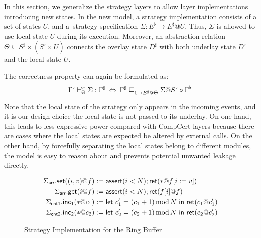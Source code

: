 \documentclass[acmsmall,review,anonymous]{acmart}\settopmatter{printfolios=true,printccs=false,printacmref=false}
\begin{document}

In this section,
we generalize the strategy layers
to allow layer implementations
introducing new states.
In the new model,
a strategy implementation consists of
a set of states $U$,
and a~strategy specification $\Sigma : E^\flat \rightarrow E^\sharp @U$.
Thus, $\Sigma$ is allowed to
use local state $U$ during its execution.
Moreover, an abstraction relation
$\Theta \subseteq S^\sharp \times (S^\flat \times U)$
connects the overlay state $D^\sharp$
with both underlay state $D^\flat$
and the local state $U$.

The correctness property can again be formulated as:
\[
  \Gamma^\flat \vdash^\kw{st}_\Theta \Sigma : \Gamma^\sharp
  \:\Leftrightarrow\:
  \Gamma^\sharp \sqsubseteq_{1 \rightarrow E^\sharp@\hat{\Theta}}
  \Sigma@S^\flat \circ \Gamma^\flat
  \,
\]

Note that
the local state of the strategy
only appears in the incoming events,
and it is our design choice
the local state is not passed
to its underlay.
On one hand, this leads to less expressive power
compared with CompCert layers
because there are cases
where the local states are expected be altered
by external calls.
On the other hand, by forcefully separating
the local states belong to different modules,
the model is easy to reason about
and prevents potential unwanted leakage directly.

\begin{figure*}
  \centering
  \begin{align*}
    \Sigma_\kw{arr}.\kw{set}((i,v)@f)
    & := \kw{assert}(i < N); \kw{ret}(*@f[i:=v])\\
    \Sigma_\kw{arr}.\kw{get}(i@f)
    & := \kw{assert}(i < N); \kw{ret}(f[i]@f)\\
    \Sigma_\kw{cnt1}.\kw{inc_1}(*@c_1)
    &:= \kw{let}\ c'_1 = (c_1+1)\mathop{\mathrm{mod}} N\ \kw{in}\ \kw{ret}(c_1@c'_1)\\
    \Sigma_\kw{cnt2}.\kw{inc_2}(*@c_2)
    & := \kw{let}\ c'_2 = (c_2+1)\mathop{\mathrm{mod}} N\ \kw{in}\ \kw{ret}(c_2@c'_2)
  \end{align*}
  \caption{Strategy Implementation for the Ring Buffer}
  \label{fig:mrb}
\end{figure*}
\end{document}
